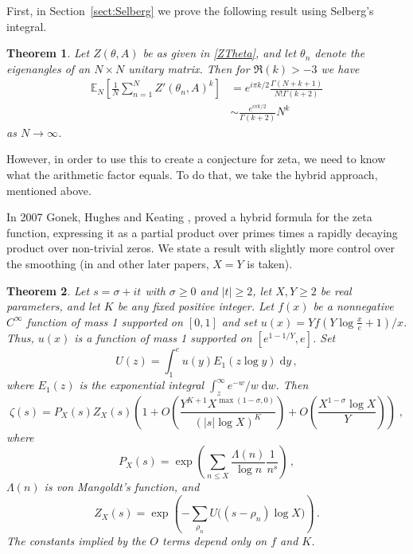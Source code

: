 \documentclass[12pt,a4paper,reqno]{amsart}
\newtheorem{theorem}{Theorem}
\theoremstyle{remark}
\numberwithin{equation}{section}
\newcommand{\ii}{i}
\newcommand{\dd}{\mathrm{d}}
\newcommand{\E}{\mathbb{E}}
\begin{document}
First, in Section~\ref{sect:Selberg} we prove the following result using Selberg's integral.
\begin{theorem}\label{thm:RMTn1}
Let $Z(\theta,A)$ be as given in \eqref{ZTheta}, and let $\theta_n$ denote the eigenangles of an $N\times N$ unitary matrix. Then for $\Re(k)>-3$ we have
\begin{align*}
\E_N\left[ \frac{1}{N} \sum_{n=1}^N  Z'(\theta_n,A)^k \right] &= e^{i \pi k /2} \frac{\Gamma(N+k+1)}{ N! \Gamma(k+2)}\\
&\sim  \frac{e^{i \pi k /2}}{\Gamma(k +2)} N^{k}
\end{align*}
as $N\to\infty$. 
\end{theorem}


However, in order to use this to create a conjecture for zeta, we need to know what the arithmetic factor equals. To do that, we take the hybrid approach, mentioned above. 


In 2007 Gonek, Hughes and Keating \cite{GHK07}, proved a hybrid formula for the zeta function, expressing it as a partial product over primes times a rapidly decaying product over non-trivial zeros. We state a result with slightly more control over the smoothing  (in  \cite{GHK07} and other later papers, $X=Y$ is taken).
\begin{theorem}\label{thm:zeta as product}
     Let $s=\sigma+\ii t$ with $\sigma \geq 0$ and
     $ |t|\geq 2$, let $X,Y \geq 2$ be real parameters, and let $K$ be any fixed
     positive integer.
     Let $f(x)$ be a nonnegative $C^{\infty}$ function of mass 1 supported on $[0, 1]$ and set $u(x)=Y f(Y\log\frac{x}{e}+1)/x$.
     Thus, $u(x)$ is a
     function of mass 1 supported on $[e^{1-1/Y}, e]$.  Set
\begin{equation}\label{U definition}
U(z) = \int_1^e u(y) E_1(z\log y)\;\dd y \,,
\end{equation}
where $E_{1}(z)$ is the exponential integral $\int_{z}^{\infty}
e^{-w}/w\;\dd w $. Then
\begin{equation*}
    \zeta(s) = P_{X}(s) Z_{X}(s)  \left(1+ O\left(\frac{Y^{K+1} X^{\max(1-\sigma,0)}}{(|s|
    \log X)^{K}} \right) + O\left(\frac{X^{1-\sigma}\log X}{Y}\right) \right)\;,
\end{equation*}
where
\begin{equation}\label{eq:PX}
     P_{X}(s) =
   \exp\left(\sum_{n \leq X} \frac{\Lambda(n)}{\log n}\frac{1}{n^{s}} \right)\,,
\end{equation}
$\Lambda(n)$ is von Mangoldt's function, and
\begin{equation}\label{eq:ZX}
   Z_{X}(s) = \exp\left(-\sum_{\rho_n}U\big((s-\rho_n)\log
    X\big)\right)\,.
\end{equation}
The constants implied by the $O$ terms depend only on $f$ and $K$.
\end{theorem}
\end{document}

